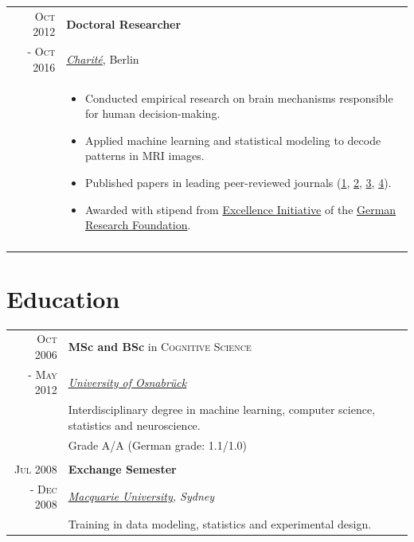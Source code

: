 \documentclass[a4paper,10pt]{article}
\begin{document}
\begin{tabular}{r|p{14.5cm}}
 \textsc{Oct 2012} & \textbf{Doctoral Researcher} \\
 \textsc{- Oct 2016} & \emph{\href{https://mindandbrain.charite.de/en}{Charité}}, Berlin \\[-1.5mm]
 & \small\begin{itemize}[leftmargin=1em, itemsep=0.5mm, parsep=0mm]
   \item Conducted empirical research on brain mechanisms responsible for human decision-making.
   \item Applied machine learning and statistical modeling to decode patterns in MRI images.
   \item Published papers in leading peer-reviewed journals (\href{https://doi.org/10.1093/scan/nsab125}{1}, \href{ https://doi.org/10.1111/acer.14812}{2}, \href{https://doi.org/10.1093/scan/nst110}{3}, \href{https://doi.org/10.1093/scan/nsw036}{4}).
   \item Awarded with stipend from \href{https://www.dfg.de/en/research_funding/programmes/excellence_initiative/index.html}{Excellence Initiative} of the \href{https://www.dfg.de/en}{German Research Foundation}.
   \end{itemize} \\
   \multicolumn{2}{c}{} \\

\end{tabular}

\section{Education}

\begin{tabular}{r|p{13cm}}

  \textsc{Oct 2006} & \textbf{MSc and BSc} in \textsc{Cognitive Science} \\[0.5mm]
  \textsc{- May 2012} &\textit{\href{https://www.ikw.uni-osnabrueck.de/en}{University of Osnabrück}} \\[0.1mm]
& \small{Interdisciplinary degree in machine learning, computer science, statistics and neuroscience.} \\[0.1mm]
& \small{Grade A/A (German grade: 1.1/1.0)} \\[0.1mm]
 \multicolumn{2}{c}{} \\

  \textsc{Jul 2008} & \textbf{Exchange Semester} \\[0.5mm]
  \textsc{- Dec 2008} &\textit{\href{https://www.mq.edu.au/}{Macquarie University}, Sydney} \\[0.1mm]
& \small{Training in data modeling, statistics and experimental design.} \\[0.1mm]

\end{tabular}
\end{document}
